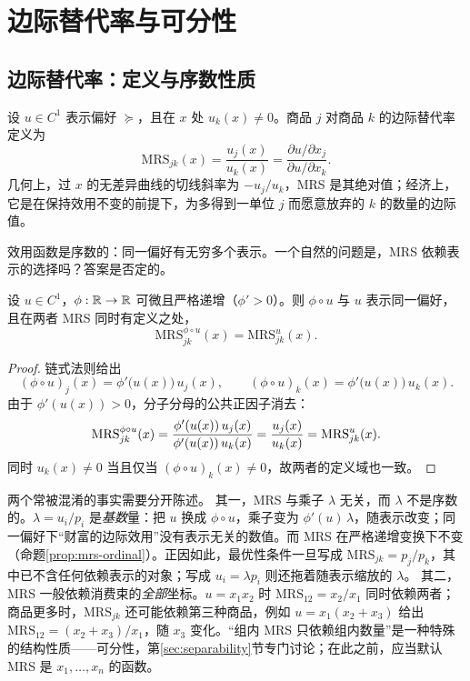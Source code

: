 \section{边际替代率与可分性}

\subsection{边际替代率：定义与序数性质}
\label{sec:mrs-def}

\begin{definition}[边际替代率]
\label{def:mrs}
设 $u\in C^1$ 表示偏好 $\succeq$，且在 $x$ 处 $u_k(x)\ne 0$。商品 $j$ 对商品 $k$ 的边际替代率定义为
\[
 \mathrm{MRS}_{jk}(x)=\frac{u_j(x)}{u_k(x)}
 =\frac{\partial u/\partial x_j}{\partial u/\partial x_k}.
\]
几何上，过 $x$ 的无差异曲线的切线斜率为 $-u_j/u_k$，MRS 是其绝对值；经济上，它是在保持效用不变的前提下，为多得到一单位 $j$ 而愿意放弃的 $k$ 的数量的边际值。
\end{definition}

效用函数是序数的：同一偏好有无穷多个表示。一个自然的问题是，MRS 依赖表示的选择吗？答案是否定的。

\begin{proposition}
\label{prop:mrs-ordinal}
设 $u\in C^1$，$\phi:\mathbb{R}\to\mathbb{R}$ 可微且严格递增（$\phi'>0$）。则 $\phi\circ u$ 与 $u$ 表示同一偏好，且在两者 MRS 同时有定义之处，
\[
 \mathrm{MRS}^{\phi\circ u}_{jk}(x)=\mathrm{MRS}^{u}_{jk}(x).
\]
\end{proposition}
\begin{proof}
链式法则给出
\[
 (\phi\circ u)_j(x)=\phi'\big(u(x)\big)\,u_j(x),
 \qquad
 (\phi\circ u)_k(x)=\phi'\big(u(x)\big)\,u_k(x).
\]
由于 $\phi'(u(x))>0$，分子分母的公共正因子消去：
\[
 \mathrm{MRS}^{\phi\circ u}_{jk}(x)
 =\frac{\phi'(u(x))\,u_j(x)}{\phi'(u(x))\,u_k(x)}
 =\frac{u_j(x)}{u_k(x)}
 =\mathrm{MRS}^{u}_{jk}(x). \qedhere
\]
同时 $u_k(x)\ne0$ 当且仅当 $(\phi\circ u)_k(x)\ne0$，故两者的定义域也一致。
\end{proof}

\begin{remark}
\label{rem:mrs-lambda}
两个常被混淆的事实需要分开陈述。
其一，MRS 与乘子 $\lambda$ 无关，而 $\lambda$ 不是序数的。$\lambda=u_i/p_i$ 是\emph{基数}量：把 $u$ 换成 $\phi\circ u$，乘子变为 $\phi'(u)\,\lambda$，随表示改变；同一偏好下“财富的边际效用”没有表示无关的数值。而 MRS 在严格递增变换下不变（命题\ref{prop:mrs-ordinal}）。正因如此，最优性条件一旦写成 $\mathrm{MRS}_{jk}=p_j/p_k$，其中已不含任何依赖表示的对象；写成 $u_i=\lambda p_i$ 则还拖着随表示缩放的 $\lambda$。
其二，MRS 一般依赖消费束的\emph{全部}坐标。$u=x_1x_2$ 时 $\mathrm{MRS}_{12}=x_2/x_1$ 同时依赖两者；商品更多时，$\mathrm{MRS}_{jk}$ 还可能依赖第三种商品，例如 $u=x_1(x_2+x_3)$ 给出 $\mathrm{MRS}_{12}=(x_2+x_3)/x_1$，随 $x_3$ 变化。“组内 MRS 只依赖组内数量”是一种特殊的结构性质——可分性，第\ref{sec:separability}节专门讨论；在此之前，应当默认 MRS 是 $x_1,\dots,x_n$ 的函数。
\end{remark}

